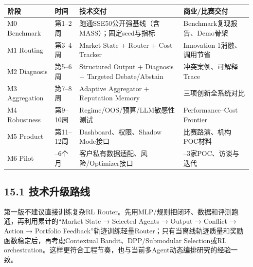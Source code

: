 \documentclass[12pt,a4paper]{ctexart}
\begin{document}
\begin{longtable}[]{@{}
  >{\raggedright\arraybackslash}p{}
  >{\raggedright\arraybackslash}p{}
  >{\raggedright\arraybackslash}p{}
  >{\raggedright\arraybackslash}p{}@{}}
\toprule\noalign{}
\begin{minipage}[b]{\linewidth}\centering
\textbf{阶段}
\end{minipage} & \begin{minipage}[b]{\linewidth}\centering
\textbf{时间}
\end{minipage} & \begin{minipage}[b]{\linewidth}\centering
\textbf{技术交付}
\end{minipage} & \begin{minipage}[b]{\linewidth}\centering
\textbf{商业/比赛交付}
\end{minipage} \\
\midrule\noalign{}
\endhead
\bottomrule\noalign{}
\endlastfoot
M0 Benchmark & 第1--2周 & 跑通SSE50公开强基线（含MASS）；固定seed与指标
& Benchmark复现报告、Demo骨架 \\
M1 Routing & 第3--4周 & Market State + Router + Cost Tracker &
Innovation 1消融、调用节省 \\
M2 Diagnosis & 第5--6周 & Structured Output + Diagnosis + Targeted
Debate/Abstain & 冲突案例、可解释Trace \\
M3 Aggregation & 第7--8周 & Adaptive Aggregator + Reputation Memory &
三项创新全系统对比 \\
M4 Robustness & 第9--10周 & Regime/OOS/预算/LLM敏感性测试 &
Performance--Cost Frontier \\
M5 Product & 第11--12周 & Dashboard、权限、Shadow Mode接口 &
比赛路演、机构POC材料 \\
M6 Pilot & 3--6个月 & 客户私有数据适配、风险/Optimizer接口 &
1--3家POC、访谈与迭代 \\
\end{longtable}

\subsection{\texorpdfstring{\textbf{15.1
技术升级路线}}{15.1 技术升级路线}}\label{ux6280ux672fux5347ux7ea7ux8defux7ebf}

第一版不建议直接训练复杂RL
Router。先用MLP/规则把闭环、数据和评测跑通，再利用累计的``Market State →
Selected Agents → Output → Conflict → Action → Portfolio
Feedback''轨迹训练轻量Router；只有当离线轨迹质量和奖励函数稳定后，再考虑Contextual
Bandit、DPP/Submodular Selection或RL
orchestration。这样更符合工程节奏，也与当前多Agent动态编排研究的经验一致。
\end{document}
